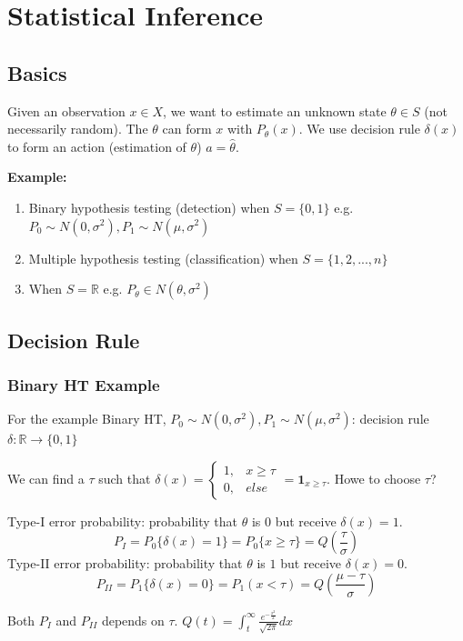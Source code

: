 \documentclass[11pt,a4paper]{article}
\begin{document}
\section{Statistical Inference}

\subsection{Basics}
Given an observation $x\in X$, we want to estimate an unknown state $\theta \in S$ (not necessarily random). The $\theta$ can form $x$ with $P_\theta(x)$. We use decision rule $\delta (x)$ to form an action (estimation of $\theta$) $a=\hat{\theta}$.

\textbf{Example:}
\begin{enumerate}[(1)]
    \item Binary hypothesis testing (detection) when $S=\{0,1\}$ e.g. $P_0\sim N(0,\sigma^2), P_1\sim N(\mu,\sigma^2)$
    \item Multiple hypothesis testing (classification) when $S=\{1,2,...,n\}$
    \item When $S=\mathbb{R}$ e.g. $P_\theta\in N(\theta,\sigma^2)$
\end{enumerate}

\subsection{Decision Rule}
\subsubsection*{Binary HT Example}
For the example Binary HT, $P_0\sim N(0,\sigma^2), P_1\sim N(\mu,\sigma^2)$: decision rule $\delta: \mathbb{R} \rightarrow \{0,1\}$

We can find a $\tau$ such that $\delta(x)=\left\{\begin{matrix}
    1,&x\ge \tau\\
    0,& else
\end{matrix}\right.=\mathbf{1}_{x\geq \tau}$. Howe to choose $\tau$?

Type-I error probability: probability that $\theta$ is $0$ but receive $\delta(x)=1$. $$P_I=P_0\{\delta(x)=1\}=P_0\{x\geq \tau\}=Q\left(\frac{\tau}{\sigma}\right)$$
Type-II error probability: probability that $\theta$ is $1$ but receive $\delta(x)=0$. $$P_{II}=P_1\{\delta(x)=0\}=P_1(x<\tau)=Q(\frac{\mu-\tau}{\sigma})$$

Both $P_I$ and $P_{II}$ depends on $\tau$. $Q(t)=\int_t^\infty\frac{e^{-\frac{x^2}{2}}}{\sqrt{2\pi}}dx$
\end{document}
